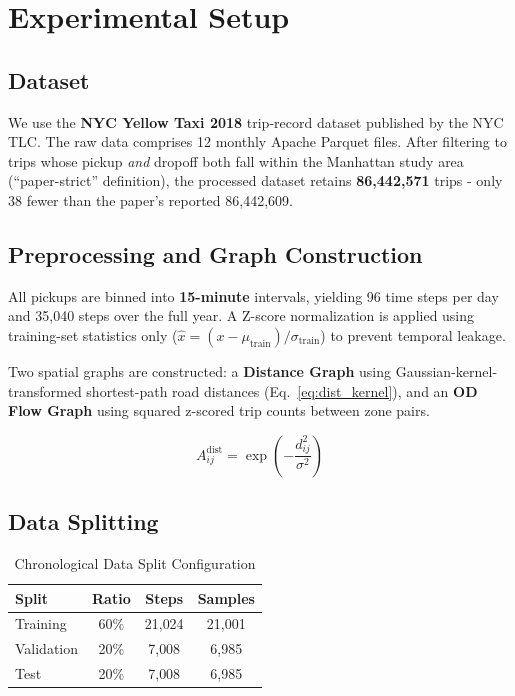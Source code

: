 \documentclass{rapportECL}
\begin{document}
\section{Experimental Setup}

\subsection{Dataset}
We use the \textbf{NYC Yellow Taxi 2018} trip-record dataset published by the NYC TLC. The raw data comprises 12 monthly Apache Parquet files. After filtering to trips whose pickup \emph{and} dropoff both fall within the Manhattan study area (``paper-strict'' definition), the processed dataset retains \textbf{86{,}442{,}571} trips - only 38 fewer than the paper's reported 86{,}442{,}609.

\subsection{Preprocessing and Graph Construction}
All pickups are binned into \textbf{15-minute} intervals, yielding 96 time steps per day and 35{,}040 steps over the full year. A Z-score normalization is applied using training-set statistics only ($\hat{x} = (x - \mu_{\text{train}}) / \sigma_{\text{train}}$) to prevent temporal leakage.

Two spatial graphs are constructed: a \textbf{Distance Graph} using Gaussian-kernel-transformed shortest-path road distances (Eq.~\ref{eq:dist_kernel}), and an \textbf{OD Flow Graph} using squared z-scored trip counts between zone pairs.

\begin{equation}
A_{ij}^{\text{dist}} = \exp\!\left(-\frac{d_{ij}^{2}}{\sigma^{2}}\right)
\label{eq:dist_kernel}
\end{equation}

\subsection{Data Splitting}
\begin{table}[H]
\centering
\caption{Chronological Data Split Configuration}
\begin{tabular}{@{}lccc@{}}
\toprule
\textbf{Split} & \textbf{Ratio} & \textbf{Steps} & \textbf{Samples} \\ \midrule
Training   & 60\% & 21{,}024 & 21{,}001 \\
Validation & 20\% &  7{,}008 &  6{,}985 \\
Test       & 20\% &  7{,}008 &  6{,}985 \\ \bottomrule
\end{tabular}
\end{table}
\end{document}
